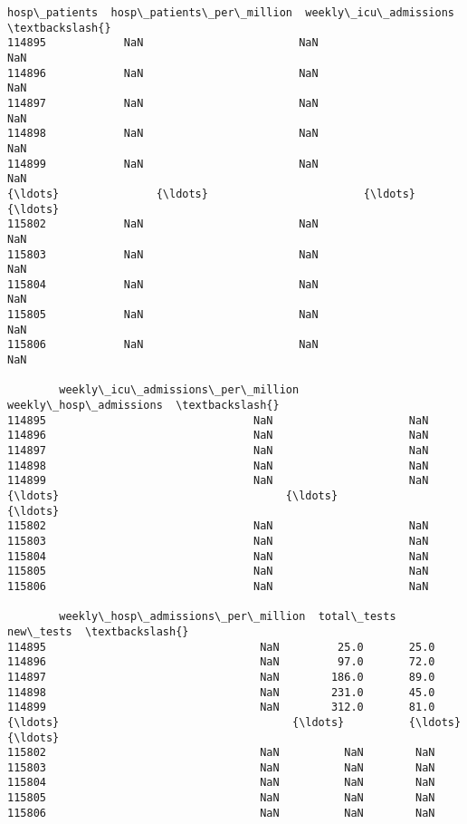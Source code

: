 \documentclass[11pt]{article}
\begin{document}
\begin{tcolorbox}[breakable, size=fbox, boxrule=.5pt, pad at break*=1mm, opacityfill=0]
\begin{Verbatim}[commandchars=\\\{\}]
        hosp\_patients  hosp\_patients\_per\_million  weekly\_icu\_admissions  \textbackslash{}
114895            NaN                        NaN                    NaN
114896            NaN                        NaN                    NaN
114897            NaN                        NaN                    NaN
114898            NaN                        NaN                    NaN
114899            NaN                        NaN                    NaN
{\ldots}               {\ldots}                        {\ldots}                    {\ldots}
115802            NaN                        NaN                    NaN
115803            NaN                        NaN                    NaN
115804            NaN                        NaN                    NaN
115805            NaN                        NaN                    NaN
115806            NaN                        NaN                    NaN

        weekly\_icu\_admissions\_per\_million  weekly\_hosp\_admissions  \textbackslash{}
114895                                NaN                     NaN
114896                                NaN                     NaN
114897                                NaN                     NaN
114898                                NaN                     NaN
114899                                NaN                     NaN
{\ldots}                                   {\ldots}                     {\ldots}
115802                                NaN                     NaN
115803                                NaN                     NaN
115804                                NaN                     NaN
115805                                NaN                     NaN
115806                                NaN                     NaN

        weekly\_hosp\_admissions\_per\_million  total\_tests  new\_tests  \textbackslash{}
114895                                 NaN         25.0       25.0
114896                                 NaN         97.0       72.0
114897                                 NaN        186.0       89.0
114898                                 NaN        231.0       45.0
114899                                 NaN        312.0       81.0
{\ldots}                                    {\ldots}          {\ldots}        {\ldots}
115802                                 NaN          NaN        NaN
115803                                 NaN          NaN        NaN
115804                                 NaN          NaN        NaN
115805                                 NaN          NaN        NaN
115806                                 NaN          NaN        NaN


\end{Verbatim}
\end{tcolorbox}
\end{document}
